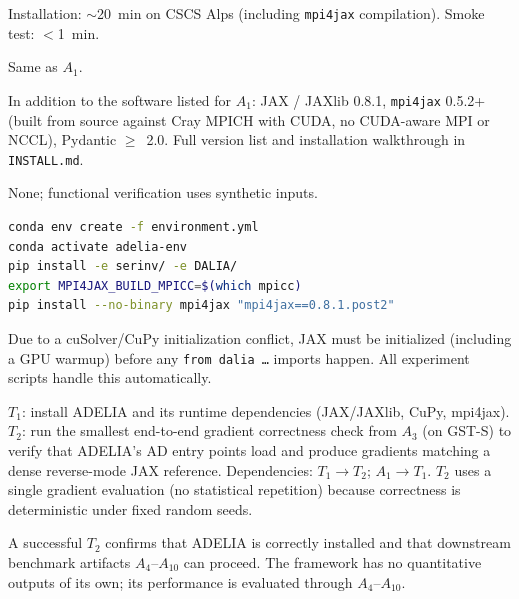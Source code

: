 \documentclass[nonacm,sigconf]{acmart}
\begin{document}
\arttime

Installation: $\sim$20~min on CSCS Alps (including \texttt{mpi4jax}
compilation). Smoke test: $<$1~min.

\artin


Same as $A_1$.


In addition to the software listed for $A_1$:
JAX / JAXlib 0.8.1, \texttt{mpi4jax} 0.5.2+ (built from source
against Cray MPICH with CUDA, no CUDA-aware MPI or NCCL),
Pydantic $\geq$~2.0. Full version list and installation
walkthrough in \texttt{INSTALL.md}.


None; functional verification uses synthetic inputs.


\begin{lstlisting}[language=bash]
conda env create -f environment.yml
conda activate adelia-env
pip install -e serinv/ -e DALIA/
export MPI4JAX_BUILD_MPICC=$(which mpicc)
pip install --no-binary mpi4jax "mpi4jax==0.8.1.post2"
\end{lstlisting}

\noindent
Due to a cuSolver/CuPy initialization conflict, JAX must be
initialized (including a GPU warmup) before any \texttt{from dalia
\ldots} imports happen. All experiment scripts handle this automatically.

\artcomp

$T_1$: install ADELIA and its runtime dependencies
(JAX/JAXlib, CuPy, mpi4jax).
$T_2$: run the smallest end-to-end gradient correctness check
from $A_3$ (on GST-S) to verify that ADELIA's AD entry points
load and produce gradients matching a dense reverse-mode JAX
reference.
Dependencies: $T_1 \rightarrow T_2$; $A_1 \rightarrow T_1$.
$T_2$ uses a single gradient evaluation (no statistical
repetition) because correctness is deterministic under fixed
random seeds.

\artout

A successful $T_2$ confirms that ADELIA is correctly installed
and that downstream benchmark artifacts $A_4$--$A_{10}$ can
proceed.  The framework has no quantitative outputs of its
own; its performance is evaluated through $A_4$--$A_{10}$.


\newartifact

\artrel
\end{document}
